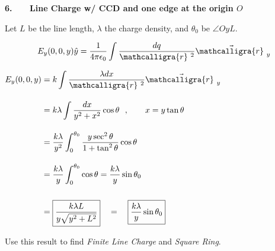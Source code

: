\documentclass[12pt]{article}
\newcommand{\scripty}[1]{\ensuremath{\mathcalligra{#1}}}
\newcommand*{\cursrr}{\scripty{r}\ }
\begin{document}
%
%
%
\newpage

\noindent
\begin{minipage}[t]{.48\textwidth}
	\textbf{6. \ \ \ Line Charge w/ CCD and one edge at the origin \(O\)}
	
	\vspace{10pt}	
	Let \(L\) be the line length, \(\lambda\) the charge density,
	and \(\theta_0\) be \(\angle OyL\).

	\vspace{5pt}
	\[ \displaystyle E_y(0,0,y) \hat{y} = \frac{1}{4 \pi \epsilon_0} \int \frac{dq}{\cursrr^2} \vec{\cursrr}_y\]

	\vspace{10pt}
	\(\begin{aligned}
		E_y(0,0,y) &= k \int \frac{\lambda dx}{\cursrr^2} \vec{\cursrr}_y\\[10pt]
		&= k \lambda \int \frac{ dx}{y^2 + x^2} \cos{\theta}
			\ \ , \hspace{20pt} x = y \tan{\theta}\\[10pt]
		&= \frac{k \lambda}{y^2} \int_0^{\theta_0} \frac{y \sec^2{\theta}}{1 + \tan^2{\theta}} \cos{\theta}\\[10pt]
		&= \frac{k \lambda}{y} \int_0^{\theta_0} \cos{\theta} = \frac{k \lambda}{y} \sin{\theta_0} \\[15pt]
		&= \boxed{ \frac{k \lambda L}{y \sqrt{y^2+L^2}} } \quad = \quad \boxed{ \frac{k \lambda}{y} \sin{\theta_0}}
	\end{aligned}\)

	\vspace{30pt}
	Use this result to find \textit{Finite Line Charge} and \textit{Square Ring}.
\end{minipage}
\hfill\vline\hfill
\end{document}

